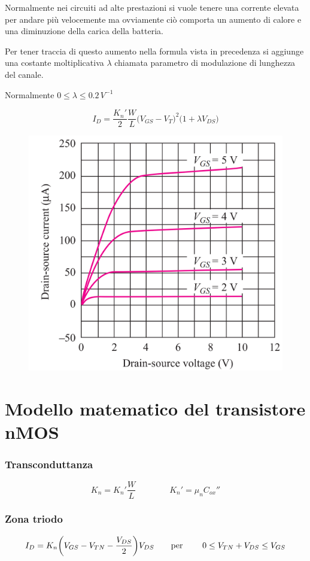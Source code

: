 Normalmente nei circuiti ad alte prestazioni si vuole tenere una corrente elevata per andare più velocemente ma ovviamente ciò comporta un aumento di calore e una diminuzione della carica della batteria.

Per tener traccia di questo aumento nella formula vista in precedenza si aggiunge una costante moltiplicativa $\lambda$ chiamata parametro di modulazione di lunghezza del canale.

Normalmente $0 \leq \lambda \leq 0.2\,V^{-1}$


\begin{equation}
    I_D = \frac{K_n'}{2}\frac{W}{L}\big(V_{GS} - V_T \big)^2\big(1+\lambda V_{DS}\big)
    \label{Equazione_corrente_pinch_off_con_lambda}
\end{equation}

\begin{figure}[htbp]
    \centering
    \includegraphics[width=0.4\linewidth]{img/lamda_modulazioneLungCanale.png}  
    
\end{figure}


\section{Modello matematico del transistore nMOS}

\subsubsection{Transconduttanza}

\begin{equation*}
    K_n = K_n'\frac{W}{L}\qquad\qquad K_n' = \mu_nC_{ox}''
\end{equation*}

\subsubsection{Zona triodo}
\begin{equation*}
    I_D = K_n\biggl(V_{GS}-V_{TN}-\frac{V_{DS}}{2}\biggl)V_{DS} \qquad\text{per } \qquad0\leq V_{TN} + V_{DS} \leq V_{GS}
\end{equation*}

